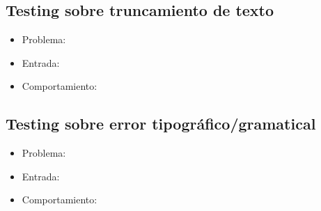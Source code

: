 \subsection{Testing sobre truncamiento de texto
}
\begin{itemize}
	\item Problema: \\
	
	\item Entrada: \\
	
	\item Comportamiento: \\
	
\end{itemize}
\subsection{Testing sobre error tipográfico/gramatical
}
\begin{itemize}
	\item Problema: \\
	
	\item Entrada: \\
	
	\item Comportamiento: \\
	
\end{itemize}
 

